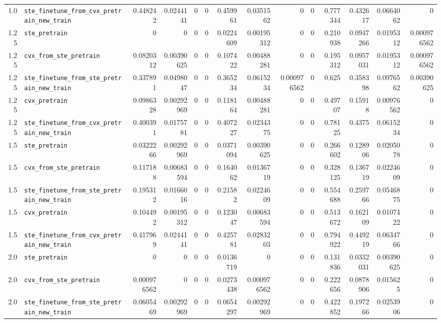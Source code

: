 \begin{longtable}{@{}r l *{12}{r}@{}}
1.0 & \texttt{ste\_finetune\_from\_cvx\_pretrain\_new\_train} & 0.448242 & 0.0244141 & 0 & 0 & 0.459961 & 0.0351562 & 0 & 0 & 0.777344 & 0.432617 & 0.0664062 & 0 \\
1.25 & \texttt{ste\_pretrain} & 0 & 0 & 0 & 0 & 0.0224609 & 0.00195312 & 0 & 0 & 0.210938 & 0.0947266 & 0.0195312 & 0.000976562 \\
1.25 & \texttt{cvx\_from\_ste\_pretrain} & 0.0820312 & 0.00390625 & 0 & 0 & 0.107422 & 0.00488281 & 0 & 0 & 0.195312 & 0.0957031 & 0.0195312 & 0.000976562 \\
1.25 & \texttt{ste\_finetune\_from\_ste\_pretrain\_new\_train} & 0.337891 & 0.0498047 & 0 & 0 & 0.365234 & 0.0615234 & 0.000976562 & 0 & 0.625 & 0.358398 & 0.0976562 & 0.00390625 \\
1.25 & \texttt{cvx\_pretrain} & 0.0986328 & 0.00292969 & 0 & 0 & 0.118164 & 0.00488281 & 0 & 0 & 0.49707 & 0.15918 & 0.00976562 & 0 \\
1.25 & \texttt{ste\_finetune\_from\_cvx\_pretrain\_new\_train} & 0.400391 & 0.0175781 & 0 & 0 & 0.407227 & 0.0234375 & 0 & 0 & 0.78125 & 0.4375 & 0.0615234 & 0 \\
1.5 & \texttt{ste\_pretrain} & 0.0322266 & 0.00292969 & 0 & 0 & 0.0371094 & 0.00390625 & 0 & 0 & 0.266602 & 0.128906 & 0.0205078 & 0 \\
1.5 & \texttt{cvx\_from\_ste\_pretrain} & 0.117188 & 0.00683594 & 0 & 0 & 0.164062 & 0.0136719 & 0 & 0 & 0.328125 & 0.136719 & 0.0224609 & 0 \\
1.5 & \texttt{ste\_finetune\_from\_ste\_pretrain\_new\_train} & 0.195312 & 0.0166016 & 0 & 0 & 0.21582 & 0.0224609 & 0 & 0 & 0.554688 & 0.259766 & 0.0546875 & 0 \\
1.5 & \texttt{cvx\_pretrain} & 0.104492 & 0.00195312 & 0 & 0 & 0.123047 & 0.00683594 & 0 & 0 & 0.513672 & 0.162109 & 0.0107422 & 0 \\
1.5 & \texttt{ste\_finetune\_from\_cvx\_pretrain\_new\_train} & 0.417969 & 0.0244141 & 0 & 0 & 0.425781 & 0.0283203 & 0 & 0 & 0.794922 & 0.449219 & 0.0634766 & 0 \\
2.0 & \texttt{ste\_pretrain} & 0 & 0 & 0 & 0 & 0.0136719 & 0 & 0 & 0 & 0.131836 & 0.0332031 & 0.00390625 & 0 \\
2.0 & \texttt{cvx\_from\_ste\_pretrain} & 0.000976562 & 0 & 0 & 0 & 0.0273438 & 0.000976562 & 0 & 0 & 0.222656 & 0.0878906 & 0.015625 & 0 \\
2.0 & \texttt{ste\_finetune\_from\_ste\_pretrain\_new\_train} & 0.0605469 & 0.00292969 & 0 & 0 & 0.0654297 & 0.00292969 & 0 & 0 & 0.422852 & 0.197266 & 0.0253906 & 0 \\

\end{longtable}
